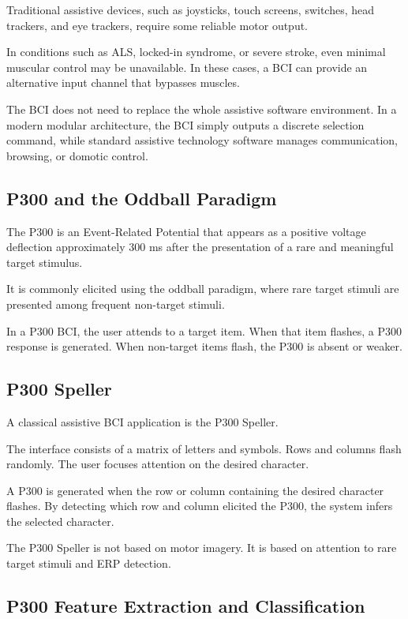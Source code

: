 Traditional assistive devices, such as joysticks, touch screens, switches, head trackers, and eye trackers, require some reliable motor output.

In conditions such as ALS, locked-in syndrome, or severe stroke, even minimal muscular control may be unavailable. In these cases, a BCI can provide an alternative input channel that bypasses muscles.

The BCI does not need to replace the whole assistive software environment. In a modern modular architecture, the BCI simply outputs a discrete selection command, while standard assistive technology software manages communication, browsing, or domotic control.

\subsection{P300 and the Oddball Paradigm}

The P300 is an Event-Related Potential that appears as a positive voltage deflection approximately 300 ms after the presentation of a rare and meaningful target stimulus.

It is commonly elicited using the oddball paradigm, where rare target stimuli are presented among frequent non-target stimuli.

In a P300 BCI, the user attends to a target item. When that item flashes, a P300 response is generated. When non-target items flash, the P300 is absent or weaker.

\subsection{P300 Speller}

A classical assistive BCI application is the P300 Speller.

The interface consists of a matrix of letters and symbols. Rows and columns flash randomly. The user focuses attention on the desired character.

A P300 is generated when the row or column containing the desired character flashes. By detecting which row and column elicited the P300, the system infers the selected character.

\begin{authornote}
The P300 Speller is not based on motor imagery. It is based on attention to rare target stimuli and ERP detection.
\end{authornote}

\subsection{P300 Feature Extraction and Classification}

